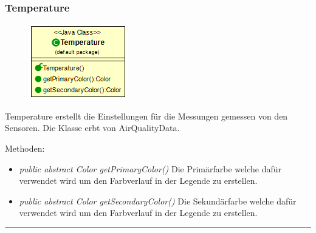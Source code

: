 \subsubsection{Temperature}
\begin{minipage}{0.3\textwidth}
    \begin{figure}[H]
        {\centering\includegraphics[scale = 0.6
        ]{media/view/airquality/Temperature_Class.png}}
    \end{figure}
    \end{minipage} \hfill
    \begin{minipage}{0.6\textwidth}
Temperature erstellt die Einstellungen für die Messungen gemessen von den Sensoren. Die Klasse erbt von AirQualityData.
\end{minipage}
Methoden: \begin{itemize} [noitemsep]
	\item \emph{public abstract Color getPrimaryColor()} Die Primärfarbe welche dafür verwendet wird um den Farbverlauf in der Legende zu erstellen.
	\item \emph{public abstract Color getSecondaryColor()} Die Sekundärfarbe welche dafür verwendet wird um den Farbverlauf in der Legende zu erstellen.
\end{itemize}

\rule{\textwidth}{0.4pt}
